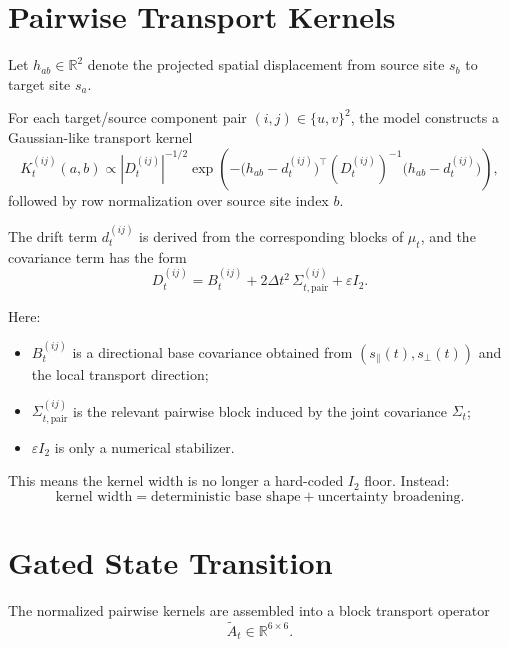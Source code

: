 \documentclass[11pt,a4paper]{article}
\newcommand{\R}{\mathbb{R}}
\newcommand{\Id}{I}
\begin{document}
\section{Pairwise Transport Kernels}

Let $h_{ab} \in \R^2$ denote the projected spatial displacement from source site $s_b$ to target site $s_a$.

For each target/source component pair $(i,j) \in \{u,v\}^2$, the model constructs a Gaussian-like transport kernel
\begin{equation}
K_t^{(ij)}(a,b)
\propto
\left|D_t^{(ij)}\right|^{-1/2}
\exp\!\left(
-
\bigl(h_{ab} - d_t^{(ij)}\bigr)^\top
\left(D_t^{(ij)}\right)^{-1}
\bigl(h_{ab} - d_t^{(ij)}\bigr)
\right),
\end{equation}
followed by row normalization over source site index $b$.

The drift term $d_t^{(ij)}$ is derived from the corresponding blocks of $\mu_t$, and the covariance term has the form
\begin{equation}
D_t^{(ij)} = B_t^{(ij)} + 2 \Delta t^2 \, \Sigma_{t,\mathrm{pair}}^{(ij)} + \varepsilon \Id_2.
\end{equation}

Here:
\begin{itemize}
  \item $B_t^{(ij)}$ is a directional base covariance obtained from $(s_{\parallel}(t), s_{\perp}(t))$ and the local transport direction;
  \item $\Sigma_{t,\mathrm{pair}}^{(ij)}$ is the relevant pairwise block induced by the joint covariance $\Sigma_t$;
  \item $\varepsilon \Id_2$ is only a numerical stabilizer.
\end{itemize}

This means the kernel width is no longer a hard-coded $\Id_2$ floor. Instead:
\begin{equation}
\text{kernel width} = \text{deterministic base shape} + \text{uncertainty broadening}.
\end{equation}

\section{Gated State Transition}

The normalized pairwise kernels are assembled into a block transport operator
\begin{equation}
\widetilde{A}_t \in \R^{6 \times 6}.
\end{equation}
\end{document}
